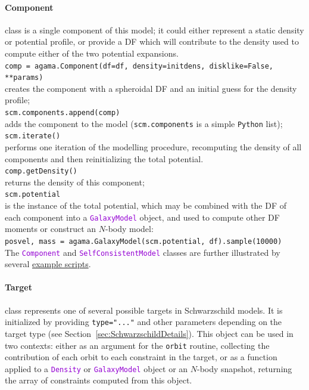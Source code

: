 \documentclass[12pt]{article}
\newcommand{\Python}{\texttt{Python}\xspace}
\newcommand{\ttt}[1]{\textcolor{darkviolet}{\texttt{#1}}}
\newcommand{\ppp}[1]{\textcolor{darkolive} {\texttt{#1}}}
\begin{document}
\paragraph{Component} class is a single component of this model; it could either represent a static density or potential profile, or provide a DF which will contribute to the density used to compute either of the two potential expansions.\\[2mm]
\texttt{comp = agama.Component(df=df, density=initdens, disklike=False, **params)}\\
creates the component with a spheroidal DF and an initial guess for the density profile;\\[2mm]
\texttt{scm.components.append(comp)}\\
adds the component to the model (\texttt{scm.components} is a simple \Python list);\\[2mm]
\texttt{scm.iterate()}\\
performs one iteration of the modelling procedure, recomputing the density of all components and then reinitializing the total potential.\\[2mm]
\texttt{comp.getDensity()}\\
returns the density of this component; \\[2mm]
\texttt{scm.potential}\\ is the instance of the total potential, which may be combined with the DF of each component into a \ttt{GalaxyModel} object, and used to compute other DF moments or construct an $N$-body model:\\
\texttt{posvel, mass = agama.GalaxyModel(scm.potential, df).sample(10000)}\\[2mm]
The \ttt{Component} and \ttt{SelfConsistentModel} classes are further illustrated by several \hyperref[sec:ExampleSCM]{example scripts}.

\paragraph{Target} class represents one of several possible targets in Schwarzschild models. It is initialized by providing \ppp{type="..."} and other parameters depending on the target type (see Section~\ref{sec:SchwarzschildDetails}). This object can be used in two contexts: either as an argument for the \texttt{orbit} routine, collecting the contribution of each orbit to each constraint in the target, or as a function applied to a \ttt{Density} or \ttt{GalaxyModel} object or an $N$-body snapshot, returning the array of constraints computed from this object.
\end{document}

